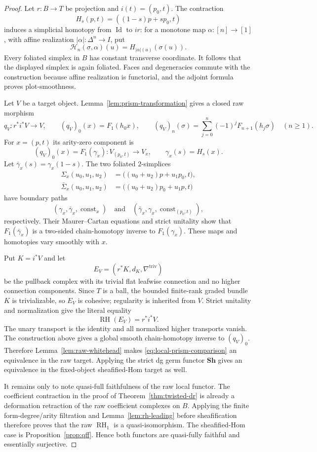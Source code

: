\documentclass[10pt,a4paper]{amsart}
\newcommand{\RH}{\operatorname{RH}}
\newcommand{\id}{\operatorname{Id}}
\begin{document}
\begin{proof}
Let $r:B\to T$ be projection and $i(t)=(p_0,t)$.  The contraction
\[
 H_s(p,t)=((1-s)p+sp_0,t)
\]
induces a simplicial homotopy from $\id$ to $ir$: for a monotone map
$\alpha:[n]\to[1]$, with affine realization
$|\alpha|:\Delta^n\to I$, put
\[
 \mathcal H_n(\sigma,\alpha)(u)
 =
 H_{|\alpha|(u)}(\sigma(u)).
\]
Every foliated simplex in $B$ has constant transverse coordinate.
It follows that the displayed simplex is again foliated.  Faces and
degeneracies commute with the construction because affine realization
is functorial, and the adjoint formula proves plot-smoothness.

Let $V$ be a target object.  Lemma~\ref{lem:prism-transformation}
gives a closed raw morphism
\begin{equation}\label{eq:local-prism-comparison}
 q_V:r^*i^*V\longrightarrow V,
 \qquad
 (q_V)_0(x)=F_1(h_0x),
 \qquad
 (q_V)_n(\sigma)=
 \sum_{j=0}^n(-1)^jF_{n+1}(h_j\sigma)
 \quad(n\geq1).
\end{equation}
For $x=(p,t)$ its arity-zero component is
\[
 (q_V)_0(x)=F_1(\gamma_x):
 V_{(p_0,t)}\longrightarrow V_x,
 \qquad
 \gamma_x(s)=H_s(x).
\]
Let $\bar\gamma_x(s)=\gamma_x(1-s)$.  The two foliated
$2$-simplices
\begin{align*}
 \Sigma_x(u_0,u_1,u_2)
 &=
 \bigl((u_0+u_2)p+u_1p_0,t\bigr),\\
 \bar\Sigma_x(u_0,u_1,u_2)
 &=
 \bigl((u_0+u_2)p_0+u_1p,t\bigr)
\end{align*}
have boundary paths
\[
 (\gamma_x,\bar\gamma_x,\operatorname{const}_x)
 \quad\text{and}\quad
 (\bar\gamma_x,\gamma_x,\operatorname{const}_{(p_0,t)}),
\]
respectively.  Their Maurer--Cartan equations and strict unitality
show that $F_1(\bar\gamma_x)$ is a two-sided chain-homotopy inverse to
$F_1(\gamma_x)$.  These maps and homotopies vary smoothly with $x$.

Put $K=i^*V$ and let
\[
 E_V=(r^*K,d_K,\nabla^{\mathrm{triv}})
\]
be the pullback complex with its trivial flat leafwise connection and
no higher connection components.  Since $T$ is a ball, the bounded
finite-rank graded bundle $K$ is trivializable, so $E_V$ is cohesive;
regularity is inherited from $V$.  Strict unitality and normalization
give the literal equality
\[
 \RH(E_V)=r^*i^*V.
\]
The unary transport is the identity and all normalized higher
transports vanish.  The construction above gives a global smooth
chain-homotopy inverse to $(q_V)_0$.  Therefore
Lemma~\ref{lem:raw-whitehead} makes
\eqref{eq:local-prism-comparison} an equivalence in the raw target.
Applying the strict dg germ functor $\mathbf{Sh}$ gives an equivalence
in the fixed-object sheafified-Hom target as well.

It remains only to note quasi-full faithfulness of the raw local
functor.  The coefficient contraction in the proof of
Theorem~\ref{thm:twisted-dr} is already a deformation retraction of
the raw coefficient complexes on $B$.  Applying the finite
form-degree/arity filtration and
Lemma~\ref{lem:rh-leading} before sheafification therefore proves that
the raw $\RH_1$ is a quasi-isomorphism.  The sheafified-Hom case is
Proposition~\ref{prop:qff}.  Hence both functors are quasi-fully
faithful and essentially surjective.
\end{proof}
\end{document}
